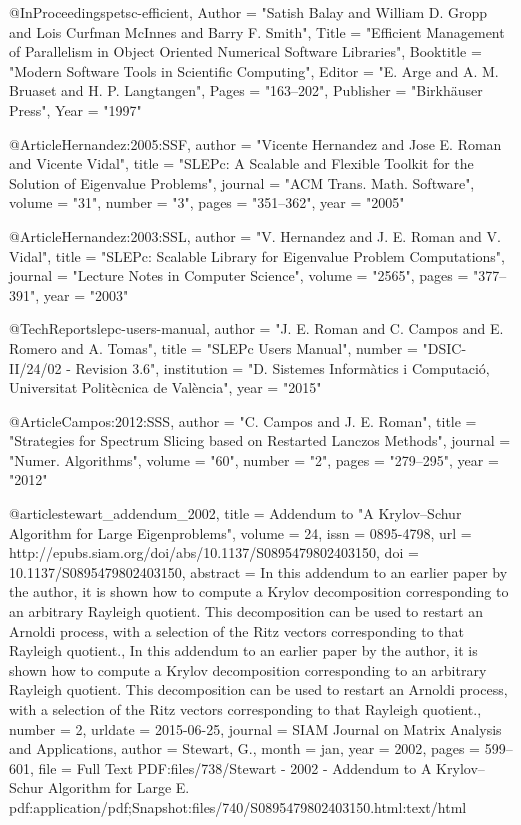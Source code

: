 @InProceedings{petsc-efficient,
  Author = "Satish Balay and William D. Gropp and Lois Curfman McInnes and Barry F.  Smith",
  Title = "Efficient Management of Parallelism in Object Oriented Numerical Software Libraries",
  Booktitle = "Modern Software Tools in Scientific Computing",
  Editor = "E. Arge and A. M. Bruaset and H. P. Langtangen",
  Pages = "163--202",
  Publisher = "Birkh{\"{a}}user Press",
  Year = "1997"
}

@Article{Hernandez:2005:SSF,
   author  = "Vicente Hernandez and Jose E. Roman and Vicente Vidal",
   title   = "{SLEPc}: A Scalable and Flexible Toolkit for the Solution of Eigenvalue
              Problems",
   journal = "{ACM} Trans. Math. Software",
   volume  = "31",
   number  = "3",
   pages   = "351--362",
   year    = "2005"
}

@Article{Hernandez:2003:SSL,
   author  = "V. Hernandez and J. E. Roman and V. Vidal",
   title   = "{SLEPc}: {S}calable {L}ibrary for {E}igenvalue {P}roblem {C}omputations",
   journal = "Lecture Notes in Computer Science",
   volume  = "2565",
   pages   = "377--391",
   year    = "2003"
}

@TechReport{slepc-users-manual,
   author  = "J. E. Roman and C. Campos and E. Romero and A. Tomas",
   title   = "{SLEPc} Users Manual",
   number  = "DSIC-II/24/02 - Revision 3.6",
   institution = "D. Sistemes Inform\`atics i Computaci\'o,
                  Universitat Polit\`ecnica de Val\`encia",
   year    = "2015"
}

@Article{Campos:2012:SSS,
  author   = "C. Campos and J. E. Roman",
  title    = "Strategies for Spectrum Slicing based on Restarted {Lanczos} Methods",
  journal  = "Numer. Algorithms",
  volume   = "60",
  number   = "2",
  pages    = "279--295",
  year     = "2012"
}

@article{stewart_addendum_2002,
    title = {Addendum to "{A} {Krylov}--{Schur} {Algorithm} for {Large} {Eigenproblems}"},
    volume = {24},
    issn = {0895-4798},
    url = {http://epubs.siam.org/doi/abs/10.1137/S0895479802403150},
    doi = {10.1137/S0895479802403150},
    abstract = {In this addendum to an earlier paper by the author, it is shown how to compute a Krylov   decomposition corresponding to an arbitrary Rayleigh quotient. This decomposition can be used to restart  an Arnoldi process, with a selection of the Ritz vectors corresponding to that Rayleigh quotient.,  In    this addendum to an earlier paper by the author, it is shown how to compute a Krylov decomposition        corresponding to an arbitrary Rayleigh quotient. This decomposition can be used to restart an Arnoldi     process, with a selection of the Ritz vectors corresponding to that Rayleigh quotient.},
    number = {2},
    urldate = {2015-06-25},
    journal = {SIAM Journal on Matrix Analysis and Applications},
    author = {Stewart, G.},
    month = jan,
    year = {2002},
    pages = {599--601},
    file = {Full Text PDF:files/738/Stewart - 2002 - Addendum to A Krylov--Schur Algorithm for Large E.   pdf:application/pdf;Snapshot:files/740/S0895479802403150.html:text/html}
}

